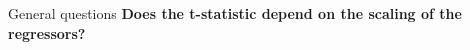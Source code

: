 \documentclass{beamer}
\begin{document}
% 
% 
% 
% 
% 
% 


\begin{frame}{General questions}
  \textbf{Does the t-statistic depend on the scaling of the regressors?}

% 
% 
\end{frame} 


% 
\end{document}
